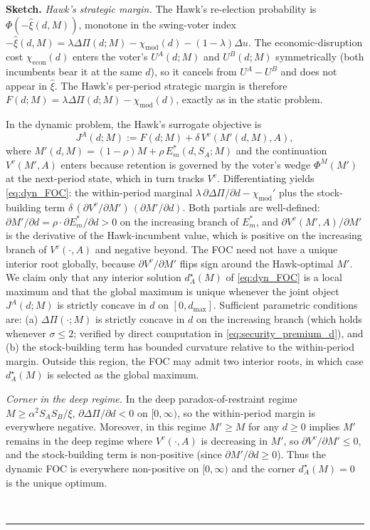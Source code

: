 \documentclass[11pt,twoside]{extarticle}
\newenvironment{proof}[1][Proof]{\noindent \textbf{#1.} }{\ \rule{0.5em}{0.5em}}
\begin{document}
\begin{proof}[Sketch]
\textit{Hawk's strategic margin.} The Hawk's re-election probability is
$\Phi(-\hat\xi(d, M))$, monotone in the swing-voter index
$-\hat\xi(d, M) = \lambda \Delta\Pi(d; M) - \chi_{\mathrm{mod}}(d) - (1-\lambda)\Delta u$.
The economic-disruption cost $\chi_{\mathrm{econ}}(d)$ enters the voter's
$U^A(d; M)$ and $U^B(d; M)$ symmetrically (both incumbents bear it at
the same $d$), so it cancels from $U^A - U^B$ and does not appear in
$\hat\xi$. The Hawk's per-period strategic margin is therefore
$F(d; M) = \lambda \Delta\Pi(d; M) - \chi_{\mathrm{mod}}(d)$, exactly as
in the static problem.

In the dynamic problem, the Hawk's surrogate objective is
\begin{equation}\label{eq:hawk_objective}
J^A(d; M) := F(d; M) + \delta\,V^v(M'(d, M), A),
\end{equation}
where $M'(d, M) = (1 - \rho)M + \rho\,E_m^*(d, S_A; M)$ and the
continuation $V^v(M', A)$ enters because retention is governed by the
voter's wedge $\Phi^M(M')$ at the next-period state, which in turn
tracks $V^v$. Differentiating yields \autoref{eq:dyn_FOC}: the
within-period marginal $\lambda\,\partial\Delta\Pi/\partial d - \chi_{\mathrm{mod}}'$
plus the stock-building term
$\delta\,(\partial V^v/\partial M')\,(\partial M'/\partial d)$. Both
partials are well-defined: $\partial M'/\partial d = \rho \cdot
\partial E_m^*/\partial d > 0$ on the increasing branch of $E_m^*$, and
$\partial V^v(M', A)/\partial M'$ is the derivative of the Hawk-incumbent
value, which is positive on the increasing branch of $V^v(\cdot, A)$ and
negative beyond. The FOC need not have a unique interior root globally,
because $\partial V^v/\partial M'$ flips sign around the Hawk-optimal
$M'$. We claim only that any interior solution $d_A^\star(M)$ of
\autoref{eq:dyn_FOC} is a local maximum and that the global maximum is
unique whenever the joint object $J^A(d; M)$ is strictly concave in $d$
on $[0, d_{\max}]$. Sufficient parametric conditions are: (a)
$\Delta\Pi(\cdot; M)$ is strictly concave in $d$ on the increasing
branch (which holds whenever $\sigma \le 2$; verified by direct
computation in \autoref{eq:security_premium_d}), and (b) the
stock-building term has bounded curvature relative to the within-period
margin. Outside this region, the FOC may admit two interior roots, in
which case $d_A^\star(M)$ is selected as the global maximum.

\textit{Corner in the deep regime.} In the deep paradox-of-restraint
regime $M \ge \alpha^2 S_A S_B / \xi$, $\partial \Delta\Pi / \partial d < 0$
on $[0, \infty)$, so the within-period margin is everywhere negative.
Moreover, in this regime $M' \ge M$ for any $d \ge 0$ implies $M'$
remains in the deep regime where $V^v(\cdot, A)$ is decreasing in $M'$,
so $\partial V^v/\partial M' \le 0$, and the stock-building term is
non-positive (since $\partial M'/\partial d \ge 0$). Thus the dynamic
FOC is everywhere non-positive on $[0, \infty)$ and the corner
$d_A^\star(M) = 0$ is the unique optimum.


\end{proof}
\end{document}

